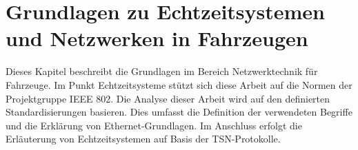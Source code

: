 \chapter{Grundlagen zu Echtzeitsystemen und Netzwerken in Fahrzeugen}\label{sec:Grundlagen}
Dieses Kapitel beschreibt die Grundlagen im Bereich Netzwerktechnik für Fahrzeuge.
Im Punkt Echtzeitsysteme stützt sich diese Arbeit auf die Normen der Projektgruppe IEEE 802. Die Analyse dieser Arbeit wird auf den definierten Standardisierungen basieren. Dies umfasst die Definition der verwendeten Begriffe und die Erklärung von Ethernet-Grundlagen. Im Anschluss erfolgt die Erläuterung von Echtzeitsystemen auf Basis der \acf{TSN}-Protokolle.








